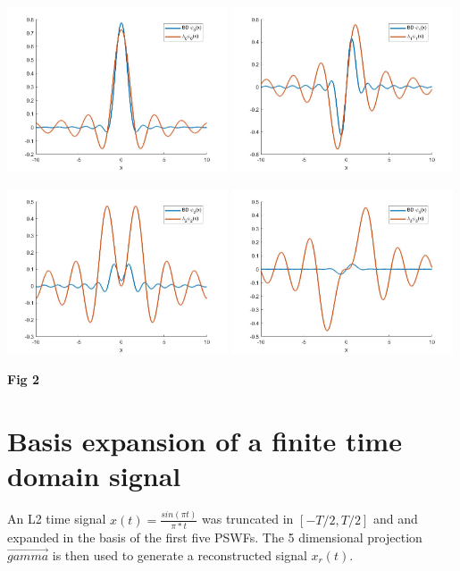\documentclass[a4paper,10pt]{article}
\begin{document}
\begin{center}
\includegraphics[width=0.49\textwidth]{"BD_1.jpg"}
\includegraphics[width=0.49\textwidth]{"BD_2.jpg"}

\includegraphics[width=0.49\textwidth]{"BD_3.jpg"}
\includegraphics[width=0.49\textwidth]{"BD_4.jpg"}

\textbf{Fig 2}
\end{center}

\section{Basis expansion of a finite time domain signal}
An L2 time signal $x(t) = \frac{sin(\pi t)}{\pi*t} $ was truncated in $[-T/2,T/2]$ and and expanded in the basis of the first five PSWFs. The 5 dimensional projection $\vec{gamma}$ is then used to generate a reconstructed signal $x_r(t)$.
\end{document}
